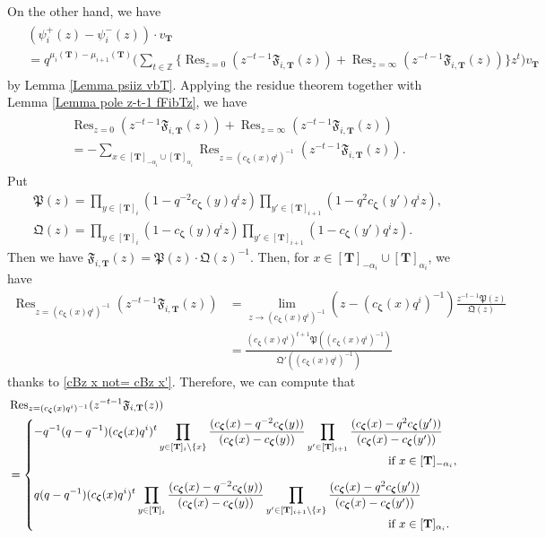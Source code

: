 \documentclass[12pt]{amsart}
\numberwithin{equation}{thm}
\newcommand\ZZ{\mathbb Z}
\newcommand\bT{\mathbf T}
\newcommand\fF{\mathfrak F}
\newcommand\fP{\mathfrak P}
\newcommand\fQ{\mathfrak Q}
\renewcommand\a{\alpha}  %
\newcommand\Bz{\boldsymbol\zeta}
\newcommand{\dis}{\displaystyle}
\newcommand\Res{\operatorname{Res}}
\begin{document}
On the other hand,  
we have 
\begin{align}
\label{psii+z - psii-z vbT}
\begin{split}
& (\psi_i^+(z) - \psi_i^- (z) ) \cdot v_{\bT}  
\\
&= q^{\mu_i(\bT) - \mu_{i+1} (\bT)} \Big(  \sum_{t \in \ZZ} 
	\Big\{ \Res_{z=0} (z^{-t-1} \fF_{i,\bT}(z) ) + \Res_{z= \infty} (z^{-t-1} \fF_{i,\bT} (z)) \Big\} z^t  \Big) v_{\bT}  
\end{split} 
\end{align}
by Lemma \ref{Lemma psiiz vbT}.  
Applying the residue theorem together with Lemma \ref{Lemma pole z-t-1 fFibTz}, 
we have 
\begin{align}
\label{Resz=0} 
\begin{split}
& \Res_{z=0} (z^{-t-1} \fF_{i,\bT}(z) ) + \Res_{z= \infty} (z^{-t-1} \fF_{i,\bT} (z)) 
\\
&= - \sum_{x \in [\bT]_{-\a_i} \cup [\bT]_{\a_i}} \Res_{z= (c_{\Bz} (x) q^i)^{-1}} (z^{-t-1} \fF_{i,\bT}(z)).
\end{split}
\end{align}
Put 
\begin{align*}
&\fP(z) = \prod_{y \in [\bT]_i} (1 - q^{-2} c_{\Bz}(y) q^i z) \prod_{y' \in [\bT]_{i+1}} (1- q^2 c_{\Bz}(y') q^i z), 
\\
& \fQ(z) = \prod_{y \in [\bT]_i} (1 - c_{\Bz}(y) q^i z) \prod_{y' \in [\bT]_{i+1}} (1 - c_{\Bz} (y') q^i z). 
\end{align*}
Then we have $\fF_{i,\bT}(z) = \fP(z) \cdot \fQ(z)^{-1}$. 
Then, for $x  \in [\bT]_{-\a_i} \cup [\bT]_{\a_i}$, 
we have 
\begin{align*}
\Res_{z = (c_{\Bz}(x)q^i)^{-1}} (z^{-t-1} \fF_{i,\bT}(z)) 
&= \lim_{z \to (c_{\Bz}(x)q^i)^{-1} } (z- (c_{\Bz}(x)q^i)^{-1}) \frac{ z^{-t-1} \fP(z)}{\fQ(z)} 
\\
&= \frac{ (c_{\Bz}(x) q^i)^{t+1} \fP ((c_{\Bz}(x)q^i)^{-1})}{ \fQ'( (c_{\Bz}(x)q^i)^{-1})}
\end{align*}
thanks to \eqref{cBz x not= cBz x'}. 
Therefore, we can compute that 
\begin{align*}
&\Res_{z = (c_{\Bz}(x)q^i)^{-1}} (z^{-t-1} \fF_{i,\bT}(z)) 
\\
&= \begin{cases}
	\dis 
	- q^{-1} (q-q^{-1}) (c_{\Bz}(x)q^i)^{t} 
		\prod_{y \in [\bT]_i \setminus \{x\}} \frac{(c_{\Bz} (x) - q^{-2} c_{\Bz}(y) ) }{ (c_{\Bz} (x) - c_{\Bz}(y) ) }
	 	\prod_{y' \in [\bT]_{i+1}} \frac{ (c_{\Bz} (x) - q^2 c_{\Bz}(y') )}{ (c_{\Bz} (x) - c_{\Bz}(y')  ) }
	\hspace{-6em}
	\\
	& \text{ if } x \in [\bT]_{-\a_i}, 
	\\[1em]
	\dis 
	q (q-q^{-1}) (c_{\Bz}(x)q^i)^{t} 
		\prod_{y \in [\bT]_i} \frac{  (c_{\Bz} (x) - q^{-2} c_{\Bz}(y) ) }{ (c_{\Bz} (x) - c_{\Bz}(y) ) }
		\prod_{y' \in [\bT]_{i+1} \setminus \{x\}} \frac{ (c_{\Bz} (x) - q^2 c_{\Bz}(y'))}{(c_{\Bz} (x) - c_{\Bz}(y'))} 
	\hspace{-6em}
	\\
	& \text{ if } x \in [\bT]_{\a_i}.
	\end{cases}
\end{align*}
\end{document}
